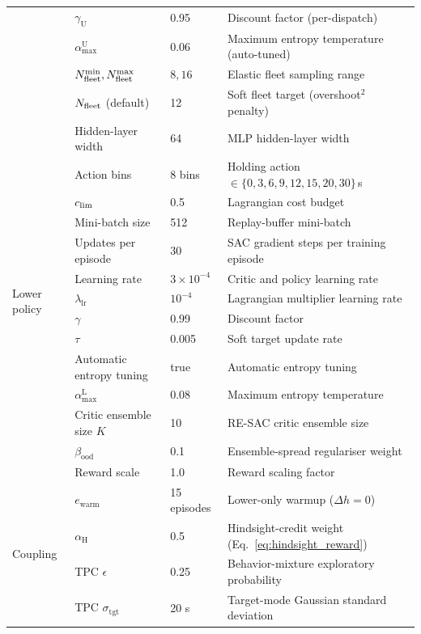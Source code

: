 \begin{table}[H]
\begin{tabular}{@{}p{}p{}p{}p{}@{}}
  & $\gamma_{\mathrm U}$           & 0.95   & Discount factor (per-dispatch) \\
  & $\alpha_{\max}^{\mathrm U}$    & 0.06   & Maximum entropy temperature (auto-tuned) \\
  & $N_{\mathrm{fleet}}^{\min},N_{\mathrm{fleet}}^{\max}$ & $8, 16$ & Elastic fleet sampling range \\
  & $N_{\mathrm{fleet}}$ (default)    & 12             & Soft fleet target (overshoot$^2$ penalty) \\
\midrule
\multirow{14}{*}{Lower policy}
  & Hidden-layer width     & 64      & MLP hidden-layer width \\
  & Action bins    & 8 bins  & Holding action $\in \{0,3,6,9,12,15,20,30\}$\,s \\
  & $c_{\mathrm{lim}}$                & 0.5     & Lagrangian cost budget \\
  & Mini-batch size     & 512     & Replay-buffer mini-batch \\
  & Updates per episode & 30 & SAC gradient steps per training episode \\
  & Learning rate              & $3 \times 10^{-4}$ & Critic and policy learning rate \\
  & $\lambda_{\text{lr}}$    & $10^{-4}$ & Lagrangian multiplier learning rate \\
  & $\gamma$                 & 0.99    & Discount factor \\
  & $\tau$                   & 0.005   & Soft target update rate \\
  & Automatic entropy tuning   & true    & Automatic entropy tuning \\
  & $\alpha_{\max}^{\mathrm L}$ & 0.08  & Maximum entropy temperature \\
  & Critic ensemble size $K$ & 10   & RE-SAC critic ensemble size \\
  & $\beta_{\mathrm{ood}}$   & 0.1     & Ensemble-spread regulariser weight \\
  & Reward scale   & 1.0     & Reward scaling factor \\
\midrule
\multirow{7}{*}{Coupling}
  & $e_{\mathrm{warm}}$       & 15 episodes   & Lower-only warmup ($\Delta h = 0$) \\
  & $\alpha_{\mathrm H}$      & 0.5           & Hindsight-credit weight (Eq.~\ref{eq:hindsight_reward}) \\
  & TPC $\epsilon$            & 0.25          & Behavior-mixture exploratory probability \\
  & TPC $\sigma_{\mathrm{tgt}}$ & 20 s        & Target-mode Gaussian standard deviation \\

\end{tabular}
\end{table}
